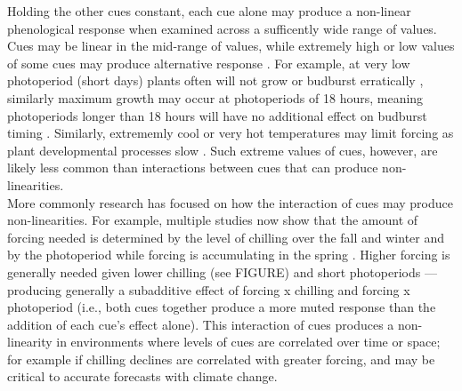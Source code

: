 \documentclass[11pt,letter]{article}
\begin{document}
Holding the other cues constant, each cue alone may produce a non-linear phenological response when examined across a sufficently wide range of values. Cues may be linear in the mid-range of values, while extremely high or low values of some cues may produce alternative response \citep{gauzere2017}. For example, at very low photoperiod (short days) plants often will not grow or budburst erratically \citep{Heide:1993,Partanen:1998aa,Singh:2017,rinne2018}, similarly maximum growth may occur at photoperiods of 18 hours, meaning photoperiods longer than 18 hours will have no additional effect on budburst timing \citep{major1980}. Similarly, extrememly cool or very hot temperatures may limit forcing as plant developmental processes slow \citep{parent2012}. Such extreme values of cues, however, are likely less common than interactions between cues that can produce non-linearities.\\

More commonly research has focused on how the interaction of cues may produce non-linearities. For example, multiple studies now show that the amount of forcing needed is determined by the level of chilling over the fall and winter and by the photoperiod while forcing is accumulating in the spring \citep[e.g.,][]{zohner2014,flynn2018}. Higher forcing is generally needed given lower chilling (see FIGURE) and short photoperiods \citep{Basler:2014aa,fu2019}---producing generally a subadditive effect of forcing x chilling and forcing x photoperiod (i.e., both cues together produce a more muted response than the addition of each cue's effect alone). This interaction of cues produces a non-linearity in environments where levels of cues are correlated over time or space; for example if chilling declines are correlated with greater forcing, and may be critical to accurate forecasts with climate change. \\ %
\end{document}
